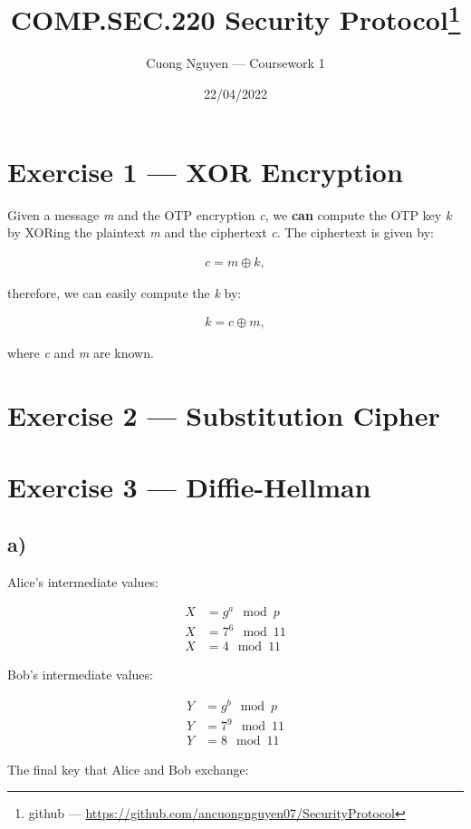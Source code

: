 \documentclass{article}
\title{COMP.SEC.220 Security Protocol\footnote{github --- \url{https://github.com/ancuongnguyen07/SecurityProtocol}}}
\author{Cuong Nguyen --- Coursework 1}
\date{22/04/2022}
\begin{document}
    
\maketitle

\section*{Exercise 1 --- XOR Encryption}
%
Given a message \emph{m} and the OTP encryption \emph{c}, we \textbf{can} compute
the OTP key \emph{k} by XORing the plaintext \emph{m} and the ciphertext \emph{c}.
The ciphertext is given by:

\begin{align*}
    c = m \oplus k,
\end{align*}

therefore, we can easily compute the \emph{k} by:

\begin{align*}
    k = c \oplus m,
\end{align*}

where \emph{c} and \emph{m} are known.

\section*{Exercise 2 --- Substitution Cipher}
%

\section*{Exercise 3 --- Diffie-Hellman}
%
\subsection*{a)}
Alice's intermediate values:

\begin{align*}
    X &= g^{a} \mod p\\
    X &= 7^6 \mod 11\\
    X &= 4 \mod 11
\end{align*}

Bob's intermediate values:

\begin{align*}
    Y &= g^{b} \mod p\\
    Y &= 7^9 \mod 11\\
    Y &= 8 \mod 11
\end{align*}

The final key that Alice and Bob exchange:
\end{document}
